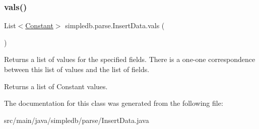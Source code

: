 \subsubsection{\texorpdfstring{vals()}{vals()}}
{\footnotesize\ttfamily List$<$\hyperlink{classsimpledb_1_1query_1_1Constant}{Constant}$>$ simpledb.\+parse.\+Insert\+Data.\+vals (\begin{DoxyParamCaption}{ }\end{DoxyParamCaption})\hspace{0.3cm}{\ttfamily [inline]}}

Returns a list of values for the specified fields. There is a one-\/one correspondence between this list of values and the list of fields. \begin{DoxyReturn}{Returns}
a list of Constant values. 
\end{DoxyReturn}


The documentation for this class was generated from the following file\+:\begin{DoxyCompactItemize}
\item 
src/main/java/simpledb/parse/Insert\+Data.\+java\end{DoxyCompactItemize}
